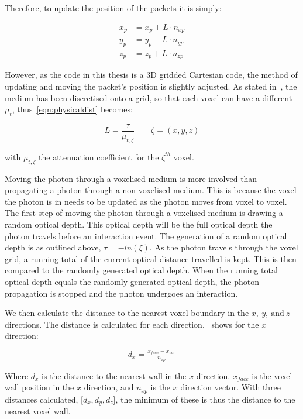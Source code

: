 Therefore, to update the position of the packets it is simply:

\begin{align}
x_p &= x_p+L\cdot n_{xp}\label{eqn:update1}\\
y_p &= y_p+L\cdot n_{yp}\label{eqn:update2}\\
z_p &= z_p+L\cdot n_{zp}\label{eqn:update3}
\end{align}

However, as the code in this thesis is a 3D gridded Cartesian code, the method of updating and moving the packet's position is slightly adjusted. As stated in~, the medium has been discretised onto a grid, so that each voxel can have a different $\mu_t$, thus~\cref{eqn:physicaldist} becomes:

\begin{equation}
L=\frac{\tau}{\mu_{t,\zeta}}\quad\quad \zeta=(x,y,z)
\label{eqn:voxeloptdist}
\end{equation}

with $\mu_{t,\zeta}$ the attenuation coefficient for the $\zeta^{th}$ voxel. 

\medskip

Moving the photon through a voxelised medium is more involved than propagating a photon through a non-voxelised medium. 
This is because the voxel the photon is in needs to be updated as the photon moves from voxel to voxel.
The first step of moving the photon through a voxelised medium is drawing a random optical depth.
This optical depth will be the full optical depth the photon travels before an interaction event.
The generation of a random optical depth is as outlined above, $\tau=-ln(\xi)$.
As the photon travels through the voxel grid, a running total of the current optical distance travelled is kept.
This is then compared to the randomly generated optical depth.
When the running total optical depth equals the randomly generated optical depth, the photon propagation is stopped and the photon undergoes an interaction.

We then calculate the distance to the nearest voxel boundary in the $x,\ y,\ \text{and}\ z$ directions.
The distance is calculated for each direction.~ shows for the $x$ direction:

\begin{equation}
d_{x} = \tfrac{x_{face} - x_{cur}}{n_{xp}}
\label{eqn:walldist}
\end{equation}

Where $d_x$ is the distance to the nearest wall in the $x$ direction. $x_{face}$ is the voxel wall position in the $x$ direction, and $n_{xp}$ is the $x$ direction vector.
With three distances calculated, [$d_x, d_y, d_z$], the minimum of these is thus the distance to the nearest voxel wall.


